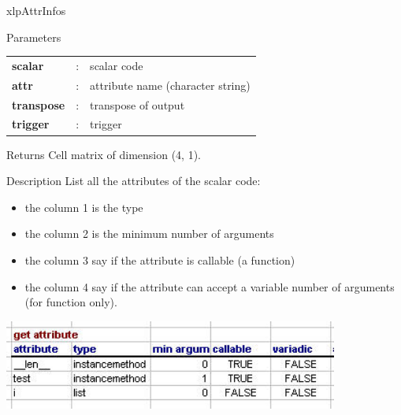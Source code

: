 \begin{xlpfunctitle}{xlpAttrInfos}

\begin{xlpfunc}{Parameters}
\begin{tabular}{p{3.5cm}cl}
\textbf{scalar}& : & scalar code \\
\textbf{attr}& : & attribute name (character string) \\
\textbf{transpose}& : & transpose of output \\
\textbf{trigger}& : & trigger 
\end{tabular}
\end{xlpfunc}


\begin{xlpfunc}{Returns}
Cell matrix of dimension (4, 1).
\end{xlpfunc}

\begin{xlpfunc}{Description}
List all the attributes of the scalar code:
\begin{itemize}
\item the column 1 is the type
\item the column 2 is the minimum number of arguments
\item the column 3 say if the attribute is callable (a function)
\item the column 4 say if the attribute can accept a variable number of arguments (for function only).
\end{itemize}
\includegraphics[width=11cm]{images/getattribute.jpg}
\end{xlpfunc}

\end{xlpfunctitle}